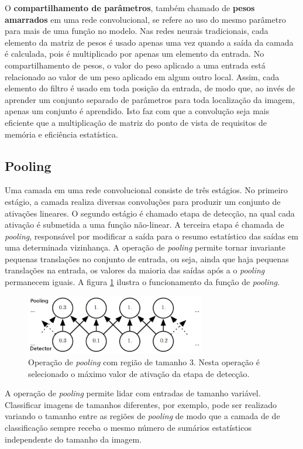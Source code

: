 O \textbf{compartilhamento de parâmetros}, também chamado de \textbf{pesos amarrados} 
em uma rede convolucional, se refere ao uso do mesmo parâmetro para mais de uma função no modelo.
Nas redes neurais tradicionais, cada elemento da matriz de pesos é usado apenas uma vez quando a
saída da camada é calculada, pois é multiplicado por apenas um elemento da entrada. No compartilhamento
de pesos, o valor do peso aplicado a uma entrada está relacionado ao valor de um peso aplicado em
algum outro local. Assim, cada elemento do filtro é usado em toda posição da entrada,
de modo que, ao invés de aprender um conjunto separado de parâmetros para toda localização da imagem, apenas
um conjunto é aprendido. Isto faz com que a convolução seja mais eficiente que a multiplicação de matriz
do ponto de vista de requisitos de memória e eficiência estatística.

\subsection{Pooling}
Uma camada em uma rede convolucional consiste de três estágios. No primeiro estágio,
a camada realiza diversas convoluções para produzir um conjunto de ativações lineares.
O segundo estágio é chamado etapa de detecção, na qual cada ativação é submetida a uma
função não-linear. A terceira etapa é chamada de \textit{pooling}, responsável por
modificar a saída para o resumo estatístico das saídas em uma determinada vizinhança. A operação de
\textit{pooling} permite tornar invariante pequenas translações no conjunto de entrada,
ou seja, ainda que haja pequenas translações na entrada, os valores da maioria das saídas após a
o \textit{pooling} permanecem iguais. A figura \ref{fig:pool} ilustra o funcionamento da função de \textit{pooling}.
\begin{figure}[htp]
\begin{center}
  \includegraphics[width=0.7\textwidth]{fig/pool}
  \caption{Operação de \textit{pooling} com região de tamanho 3. Nesta operação é selecionado o máximo valor de ativação da etapa de detecção.}
  \label{fig:pool}
\end{center}
\end{figure}

A operação de \textit{pooling} permite lidar com entradas de tamanho variável.
Classificar imagens de tamanhos diferentes, por exemplo, pode ser realizado
variando o tamanho entre as regiões de \textit{pooling} de modo que a camada de 
de classificação sempre receba o mesmo número de sumários estatísticos
independente do tamanho da imagem.
